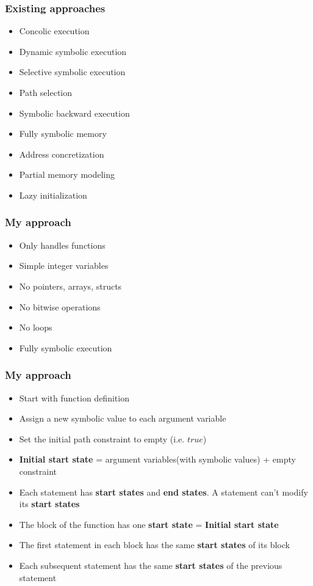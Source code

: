 \documentclass{beamer}
\begin{document}
\begin{frame}[fragile]
\frametitle{Existing approaches}
\begin{itemize}
\item Concolic execution
\item Dynamic symbolic execution
\item Selective symbolic execution
\item Path selection
\item Symbolic backward execution
\item Fully symbolic memory
\item Address concretization
\item Partial memory modeling
\item Lazy initialization

\end{itemize}
\end{frame}

\begin{frame}[fragile]
\frametitle{My approach}
\begin{itemize}
\item Only handles functions
\item Simple integer variables
\item No pointers, arrays, structs 
\item No bitwise operations
\item No loops
\item Fully symbolic execution
\end{itemize}
\end{frame}

\begin{frame}[fragile]
\frametitle{My approach}
\begin{itemize}
\item Start with function definition
\item Assign a new symbolic value to each argument variable
\item Set the initial path constraint to empty (i.e. $true$)
\item \textbf{Initial start state} = argument variables(with symbolic values) + empty constraint
\item Each statement has \textbf{start states} and \textbf{end states}. A statement can't modify its \textbf{start states}

\item The block of the function has one \textbf{start state} = \textbf{Initial start state}

\item The first statement in each block has the same \textbf{start states} of its block

\item Each subsequent statement has the same \textbf{start states} of the previous statement
\end{itemize}
\end{frame}
\end{document}
